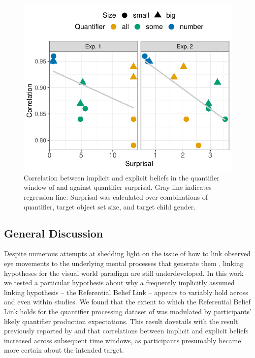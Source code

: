 \documentclass[10pt,letterpaper]{article}
\begin{document}


\begin{figure}[htbp]
\centerline{\includegraphics[width = 0.475 \textwidth]{images/surprisal_correlation.pdf}}
\caption{Correlation between implicit and explicit beliefs in the quantifier window of  and  against quantifier surprisal. Gray line indicates regression line. Surprisal was calculated over combinations of quantifier, target object set size, and target child gender.}
\label{fig:detSurprisalCorr}
\end{figure}

\subsection{General Discussion}

Despite numerous attempts at shedding light on the issue of how to link observed eye movements to the underlying mental processes that generate them \cite{SalverdaTanenhaus2017:The-Visual-World-Paradigm, tanenhaus2000eye, Allopenna1998, magnuson2019fixations}, linking hypotheses for the visual world paradigm are still underdeveloped. In this work we tested a particular hypothesis about why a frequently implicitly assumed linking hypothesis -- the Referential Belief Link -- appears to variably hold across and even within studies. We found that the extent to which the Referential Belief Link holds for the quantifier processing dataset of  was modulated by participants' likely quantifier production expectations. This result dovetails with the result previously reported by  and  that correlations between implicit and explicit beliefs increased across subsequent time windows, as participants presumably became more certain about the intended target.
\end{document}

